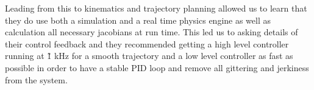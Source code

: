 Leading from this to kinematics and trajectory planning allowed us to learn that they do use both a simulation and a real time physics engine as well as calculation all necessary jacobians at run time. This led us to asking details of their control feedback and they recommended getting a high level controller running at \~1 kHz for a smooth trajectory and a low level controller as fast as possible in order to have a stable PID loop and remove all gittering and jerkiness from the system.  


